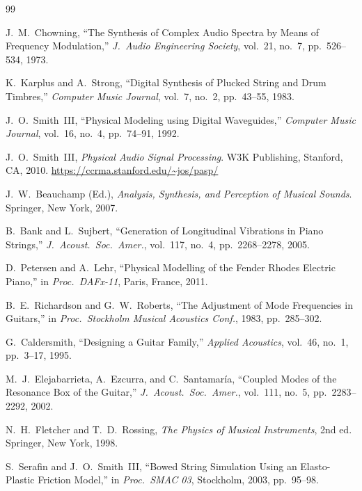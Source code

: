 \documentclass[10pt,journal,compsoc,twocolumn]{article}
\begin{document}
\begin{thebibliography}{99}

J.~M.~Chowning,
``The Synthesis of Complex Audio Spectra by Means of Frequency Modulation,''
\emph{J.\ Audio Engineering Society}, vol.~21, no.~7, pp.~526--534, 1973.

K.~Karplus and A.~Strong,
``Digital Synthesis of Plucked String and Drum Timbres,''
\emph{Computer Music Journal}, vol.~7, no.~2, pp.~43--55, 1983.

J.~O.~Smith~III,
``Physical Modeling using Digital Waveguides,''
\emph{Computer Music Journal}, vol.~16, no.~4, pp.~74--91, 1992.

J.~O.~Smith~III,
\emph{Physical Audio Signal Processing}.
W3K Publishing, Stanford, CA, 2010.
\url{https://ccrma.stanford.edu/~jos/pasp/}

J.~W.~Beauchamp (Ed.),
\emph{Analysis, Synthesis, and Perception of Musical Sounds}.
Springer, New York, 2007.

B.~Bank and L.~Sujbert,
``Generation of Longitudinal Vibrations in Piano Strings,''
\emph{J.\ Acoust.\ Soc.\ Amer.}, vol.~117, no.~4, pp.~2268--2278, 2005.

D.~Petersen and A.~Lehr,
``Physical Modelling of the Fender Rhodes Electric Piano,''
in \emph{Proc.\ DAFx-11}, Paris, France, 2011.

B.~E.~Richardson and G.~W.~Roberts,
``The Adjustment of Mode Frequencies in Guitars,''
in \emph{Proc.\ Stockholm Musical Acoustics Conf.}, 1983, pp.~285--302.

G.~Caldersmith,
``Designing a Guitar Family,''
\emph{Applied Acoustics}, vol.~46, no.~1, pp.~3--17, 1995.

M.~J.~Elejabarrieta, A.~Ezcurra, and C.~Santamar\'{i}a,
``Coupled Modes of the Resonance Box of the Guitar,''
\emph{J.\ Acoust.\ Soc.\ Amer.}, vol.~111, no.~5,
pp.~2283--2292, 2002.

N.~H.~Fletcher and T.~D.~Rossing,
\emph{The Physics of Musical Instruments}, 2nd ed.
Springer, New York, 1998.

S.~Serafin and J.~O.~Smith~III,
``Bowed String Simulation Using an Elasto-Plastic Friction Model,''
in \emph{Proc.\ SMAC 03}, Stockholm, 2003, pp.~95--98.


\end{thebibliography}
\end{document}

